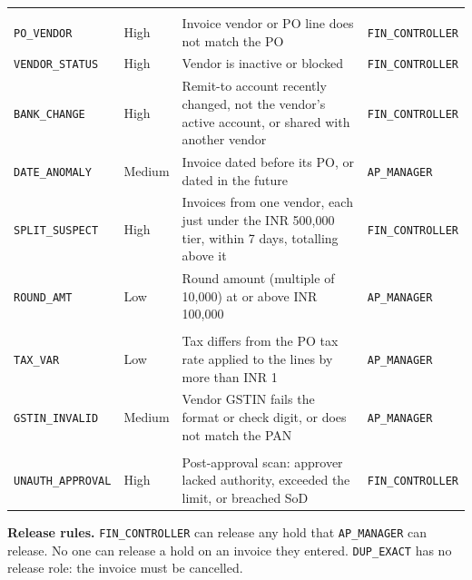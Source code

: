 \documentclass[10pt,a4paper]{article}
\begin{document}
\begin{longtable}{@{}l l p{7.3cm} l@{}}
    \addlinespace
    \multicolumn{4}{@{}l}{\textbf{Fraud}} \\
    \texttt{PO\_VENDOR} & High & Invoice vendor or PO line does not match the PO & \texttt{FIN\_CONTROLLER} \\
    \texttt{VENDOR\_STATUS} & High & Vendor is inactive or blocked & \texttt{FIN\_CONTROLLER} \\
    \texttt{BANK\_CHANGE} & High & Remit-to account recently changed, not the vendor's active account, or shared with another vendor & \texttt{FIN\_CONTROLLER} \\
    \texttt{DATE\_ANOMALY} & Medium & Invoice dated before its PO, or dated in the future & \texttt{AP\_MANAGER} \\
    \texttt{SPLIT\_SUSPECT} & High & Invoices from one vendor, each just under the INR 500,000 tier, within 7 days, totalling above it & \texttt{FIN\_CONTROLLER} \\
    \texttt{ROUND\_AMT} & Low & Round amount (multiple of 10,000) at or above INR 100,000 & \texttt{AP\_MANAGER} \\
    \addlinespace
    \multicolumn{4}{@{}l}{\textbf{Compliance}} \\
    \texttt{TAX\_VAR} & Low & Tax differs from the PO tax rate applied to the lines by more than INR 1 & \texttt{AP\_MANAGER} \\
    \texttt{GSTIN\_INVALID} & Medium & Vendor GSTIN fails the format or check digit, or does not match the PAN & \texttt{AP\_MANAGER} \\
    \addlinespace
    \multicolumn{4}{@{}l}{\textbf{Authority}} \\
    \texttt{UNAUTH\_APPROVAL} & High & Post-approval scan: approver lacked authority, exceeded the limit, or breached SoD & \texttt{FIN\_CONTROLLER} \\
\bottomrule
\end{longtable}

\textbf{Release rules.} \texttt{FIN\_CONTROLLER} can release any hold that \texttt{AP\_MANAGER} can release. No one can release a hold on an invoice they entered. \texttt{DUP\_EXACT} has no release role: the invoice must be cancelled.
\end{document}
